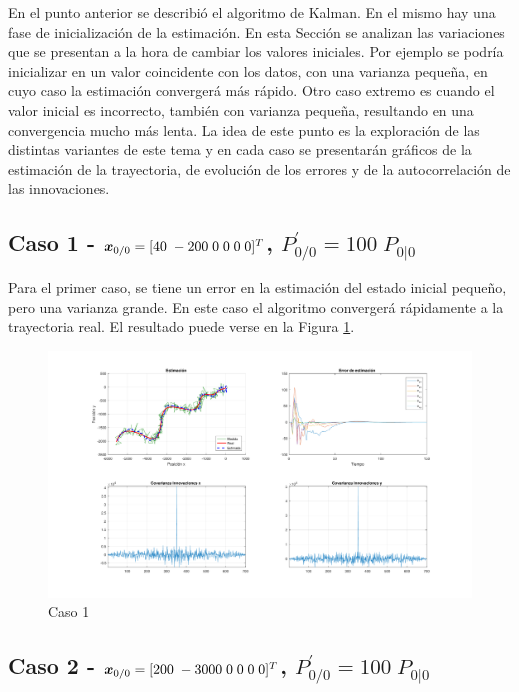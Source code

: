 
	En el punto anterior se describió el algoritmo de Kalman. En el mismo hay una fase de inicialización de la estimación. En esta Sección se analizan las variaciones que se presentan a la hora de cambiar los valores iniciales. Por ejemplo se podría inicializar en un valor coincidente con los datos, con una varianza pequeña, en cuyo caso la estimación convergerá más rápido. Otro caso extremo es cuando el valor inicial es incorrecto, también con varianza pequeña, resultando en una convergencia mucho más lenta. La idea de este punto es la exploración de las distintas variantes de este tema y en cada caso se presentarán gráficos de la estimación de la trayectoria, de evolución de los errores y de la autocorrelación de las innovaciones.
	
	\subsection{Caso 1 - $\boldsymbol{x}_{0/0} = [40\;-200\;0\;0\;0\;0]^T$, $P^{'}_{0/0}=100\; P_{0|0}$} \label{sec:ej3a}
	
		Para el primer caso, se tiene un error en la estimación del estado inicial pequeño, pero una varianza grande. En este caso el algoritmo convergerá rápidamente a la trayectoria real. El resultado puede verse en la Figura \ref{fig:ej3a}.
	
		\begin{figure}[H]
			\centering
			\includegraphics[scale=0.5,trim={6,5cm 0 0 0}]{Figuras/graf_ej3a.pdf}
			\caption{Caso 1}
			\label{fig:ej3a}
		\end{figure}
	
	\subsection{Caso 2 - $\boldsymbol{x}_{0/0} = [200\;-3000\;0\;0\;0\;0]^T$, $P^{'}_{0/0}=100\; P_{0|0}$} \label{sec:ej3b}
	
